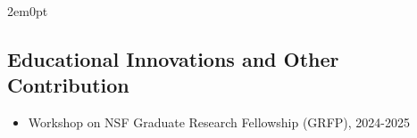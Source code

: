 \begin{adjustwidth}{2em}{0pt}
\subsection{Educational Innovations and Other Contribution}


\begin{itemize}
    \item Workshop on NSF Graduate Research Fellowship (GRFP), 2024-2025
\end{itemize}


\end{adjustwidth}
